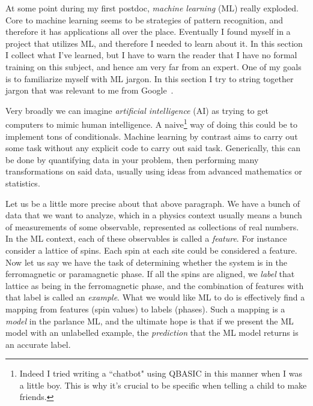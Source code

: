 At some point during my first postdoc, {\it machine learning} (ML) really exploded.
Core to machine learning seems to be strategies of pattern recognition, and
therefore it has applications all over the place. Eventually I found myself in a
project that utilizes ML, and therefore I needed to learn about it. In this
section I collect what I've learned, but I have to warn the reader that
I have no formal training on this subject, and hence am very far from an expert.
One of my goals is to familiarize myself with ML jargon. In this section I
try to string together jargon that was relevant to me from
Google~\cite{google_ML}.

Very broadly we can imagine {\it artificial intelligence} (AI) as trying to get computers to mimic human intelligence. 
A naive\footnote{Indeed I tried writing a ``chatbot" using QBASIC in this
manner when I was a little boy. This is why it's crucial to be specific
when telling a child to make friends.} way of doing this could be to implement tons 
of conditionals. Machine learning by contrast aims to carry out some
task without any explicit code to carry out said task. Generically,
this can be done by quantifying data in your problem, then performing many
transformations on said data, usually using ideas from advanced mathematics
or statistics.

Let us be a little more precise about that above paragraph.
We have a bunch of data that we want to analyze, which in a physics context
usually means a bunch of measurements of some observable,
represented as collections of real numbers. In the ML context, each of
these observables is called a {\it feature}. For instance
consider a lattice of spins. Each spin at each site could be considered
a feature. Now let us say we have the task of determining
whether the system is in the ferromagnetic or paramagnetic phase.
If all the spins are aligned, we {\it label} that lattice
as being in the ferromagnetic phase, and the combination of features
with that label is called an {\it example}.
What we would like ML to do
is effectively find a mapping from features (spin values) to labels (phases). 
Such a mapping is a {\it model} in the parlance ML, and
the ultimate hope is that if we present the ML model with an unlabelled
example, the {\it prediction} 
that the ML model returns is an accurate label.

